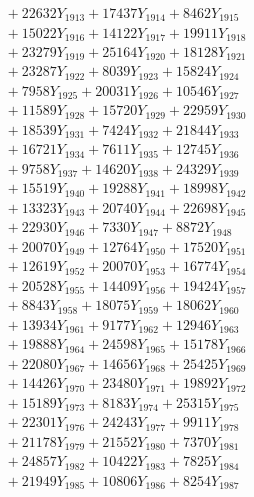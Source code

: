 \documentclass[a4paper,10pt]{article}
\begin{document}
{\begin{align}
&\;  + 22632 Y_{1913} + 17437 Y_{1914} + 8462 Y_{1915} \\[0.3ex]
&\;  + 15022 Y_{1916} + 14122 Y_{1917} + 19911 Y_{1918} \\[0.5ex]\allowbreak
&\;  + 23279 Y_{1919} + 25164 Y_{1920} + 18128 Y_{1921} \\[0.3ex]
&\;  + 23287 Y_{1922} + 8039 Y_{1923} + 15824 Y_{1924} \\[0.3ex]
&\;  + 7958 Y_{1925} + 20031 Y_{1926} + 10546 Y_{1927} \\[0.3ex]
&\;  + 11589 Y_{1928} + 15720 Y_{1929} + 22959 Y_{1930} \\[0.3ex]
&\;  + 18539 Y_{1931} + 7424 Y_{1932} + 21844 Y_{1933} \\[0.3ex]
&\;  + 16721 Y_{1934} + 7611 Y_{1935} + 12745 Y_{1936} \\[0.3ex]
&\;  + 9758 Y_{1937} + 14620 Y_{1938} + 24329 Y_{1939} \\[0.3ex]
&\;  + 15519 Y_{1940} + 19288 Y_{1941} + 18998 Y_{1942} \\[0.3ex]
&\;  + 13323 Y_{1943} + 20740 Y_{1944} + 22698 Y_{1945} \\[0.3ex]
&\;  + 22930 Y_{1946} + 7330 Y_{1947} + 8872 Y_{1948} \\[0.5ex]\allowbreak
&\;  + 20070 Y_{1949} + 12764 Y_{1950} + 17520 Y_{1951} \\[0.3ex]
&\;  + 12619 Y_{1952} + 20070 Y_{1953} + 16774 Y_{1954} \\[0.3ex]
&\;  + 20528 Y_{1955} + 14409 Y_{1956} + 19424 Y_{1957} \\[0.3ex]
&\;  + 8843 Y_{1958} + 18075 Y_{1959} + 18062 Y_{1960} \\[0.3ex]
&\;  + 13934 Y_{1961} + 9177 Y_{1962} + 12946 Y_{1963} \\[0.3ex]
&\;  + 19888 Y_{1964} + 24598 Y_{1965} + 15178 Y_{1966} \\[0.3ex]
&\;  + 22080 Y_{1967} + 14656 Y_{1968} + 25425 Y_{1969} \\[0.3ex]
&\;  + 14426 Y_{1970} + 23480 Y_{1971} + 19892 Y_{1972} \\[0.3ex]
&\;  + 15189 Y_{1973} + 8183 Y_{1974} + 25315 Y_{1975} \\[0.3ex]
&\;  + 22301 Y_{1976} + 24243 Y_{1977} + 9911 Y_{1978} \\[0.5ex]\allowbreak
&\;  + 21178 Y_{1979} + 21552 Y_{1980} + 7370 Y_{1981} \\[0.3ex]
&\;  + 24857 Y_{1982} + 10422 Y_{1983} + 7825 Y_{1984} \\[0.3ex]
&\;  + 21949 Y_{1985} + 10806 Y_{1986} + 8254 Y_{1987} \\[0.3ex]

\end{align}}
\end{document}
